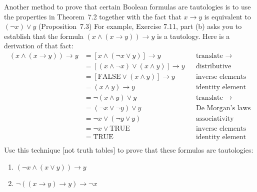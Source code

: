 \documentclass{article}
\theoremstyle{definition}
\begin{document}
\begin{question}
    Another method to prove that certain Boolean formulas
    are tautologies is to use the properties in Theorem~7.2
    together with the fact that $x \rightarrow y$ is equivalent
    to $(\neg x) \vee y$ (Proposition~7.3)
    For example, Exercise 7.11, part (b) asks you to establish that the formula $(x \wedge (x \rightarrow y)) \rightarrow y$ is 
    a tautology.  Here is a derivation of that fact:
    \begin{align*}
        (x \wedge (x \rightarrow y)) \rightarrow y
        &= [x \wedge (\neg x \vee y)] \rightarrow y
        && \text{translate $\rightarrow$} 
        \\
        &= [(x \wedge \neg x) \vee (x \wedge y)] \rightarrow y
        && \text{distributive}
        \\
        &= [\mathrm{FALSE} \vee (x\wedge y)] \rightarrow y
        && \text{inverse elements}
        \\
        &= (x\wedge y) \rightarrow y
        && \text{identity element}
        \\
        &= \neg(x\wedge y) \vee y
        && \text{translate $\rightarrow$}
        \\
        &= (\neg x \vee \neg y) \vee y
        && \text{De~Morgan's laws}
        \\
        &= \neg x \vee (\neg y \vee y)
        && \text{associativity}
        \\
        &= \neg x \vee \mathrm{TRUE}
        && \text{inverse elements}
        \\
        &= \mathrm{TRUE}
        && \text{identity element}
        \\
    \end{align*}
    Use this technique [not truth tables] to prove that these formulas
    are tautologies:
    \begin{enumerate}
        \item $(\neg x \wedge (x \vee y)) \rightarrow y$
        \item $\neg ( (x \rightarrow y) \rightarrow  y) \rightarrow \neg x$
    \end{enumerate}
\end{question}
\begin{solution}
\end{solution}
\end{document}

